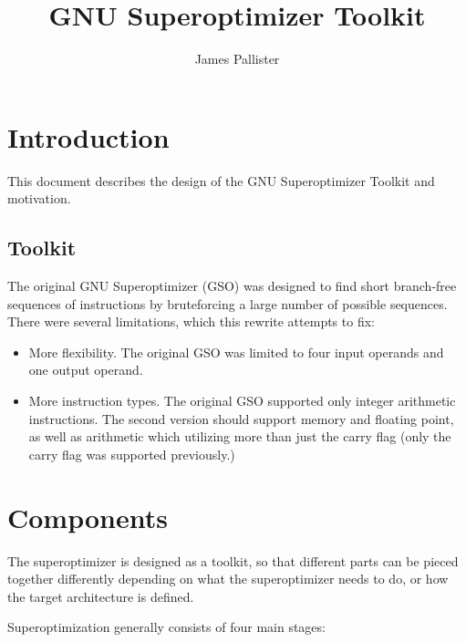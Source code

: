 \documentclass{article}
\begin{document}
\title{GNU Superoptimizer Toolkit}
\author{James Pallister}

\maketitle

\section{Introduction}

This document describes the design of the GNU Superoptimizer Toolkit and motivation.

\subsection{Toolkit}

The original GNU Superoptimizer (GSO) was designed to find short branch-free sequences of instructions by bruteforcing a large number of possible sequences. There were several limitations, which this rewrite attempts to fix:

\begin{itemize}
    \item More flexibility. The original GSO was limited to four input operands and one output operand.
    \item More instruction types. The original GSO supported only integer arithmetic instructions. The second version should support memory and floating point, as well as arithmetic which utilizing more than just the carry flag (only the carry flag was supported previously.)
\end{itemize}


\section{Components}

The superoptimizer is designed as a toolkit, so that different parts can be pieced together differently depending on what the superoptimizer needs to do, or how the target architecture is defined.

Superoptimization generally consists of four main stages:
\end{document}
